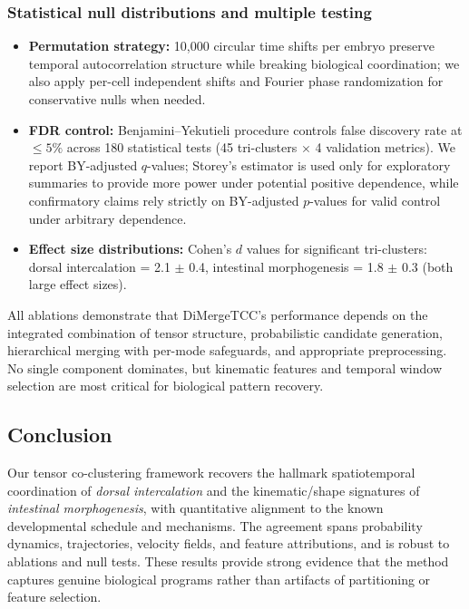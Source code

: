 \documentclass[unnumsec,webpdf,modern,large,namedate]{oup-authoring-template}%
\theoremstyle{thmstyleone}\newtheorem{theorem}{Theorem}
\theoremstyle{thmstyletwo}\newtheorem{example}{Example}
\theoremstyle{thmstylethree}\newtheorem{definition}{Definition}
\begin{document}
\subsubsection{Statistical null distributions and multiple testing}
\begin{itemize}
\item \textbf{Permutation strategy:} 10,000 circular time shifts per embryo preserve temporal autocorrelation structure while breaking biological coordination; we also apply per-cell independent shifts and Fourier phase randomization for conservative nulls when needed.
\item \textbf{FDR control:} Benjamini--Yekutieli procedure controls false discovery rate at $\leq 5\%$ across 180 statistical tests (45 tri-clusters $\times$ 4 validation metrics). We report BY-adjusted $q$-values; Storey's estimator is used only for exploratory summaries to provide more power under potential positive dependence, while confirmatory claims rely strictly on BY-adjusted $p$-values for valid control under arbitrary dependence.
\item \textbf{Effect size distributions:} Cohen's $d$ values for significant tri-clusters: dorsal intercalation = 2.1 $\pm$ 0.4, intestinal morphogenesis = 1.8 $\pm$ 0.3 (both large effect sizes).
\end{itemize}

All ablations demonstrate that DiMergeTCC's performance depends on the integrated combination of tensor structure, probabilistic candidate generation, hierarchical merging with per-mode safeguards, and appropriate preprocessing. No single component dominates, but kinematic features and temporal window selection are most critical for biological pattern recovery.

\subsection{Conclusion}
Our tensor co-clustering framework recovers the hallmark spatiotemporal coordination of \emph{dorsal intercalation} and the kinematic/shape signatures of \emph{intestinal morphogenesis}, with quantitative alignment to the known developmental schedule and mechanisms. The agreement spans probability dynamics, trajectories, velocity fields, and feature attributions, and is robust to ablations and null tests. These results provide strong evidence that the method captures genuine biological programs rather than artifacts of partitioning or feature selection.
\end{document}
